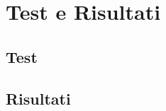 \chapter{Test e Risultati}
\label{sec:results}



\section{Test}
\label{sec:results:test}

\section{Risultati}
\label{sec:results:results}